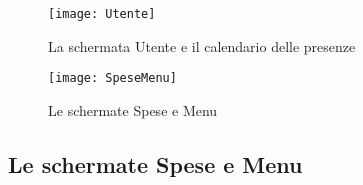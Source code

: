 \newpage

\begin{figure}[!h] 
    \centering 
    \texttt{[image: Utente]} 
    \caption{La schermata Utente e il calendario delle presenze}
    \label{fig:utente-presenze}
\end{figure}
\begin{figure}[!h] 
    \centering 
    \texttt{[image: SpeseMenu]} 
    \caption{Le schermate Spese e Menu}
    \label{fig:spese-menu}
\end{figure}
\newpage

\subsection{Le schermate Spese e Menu}

